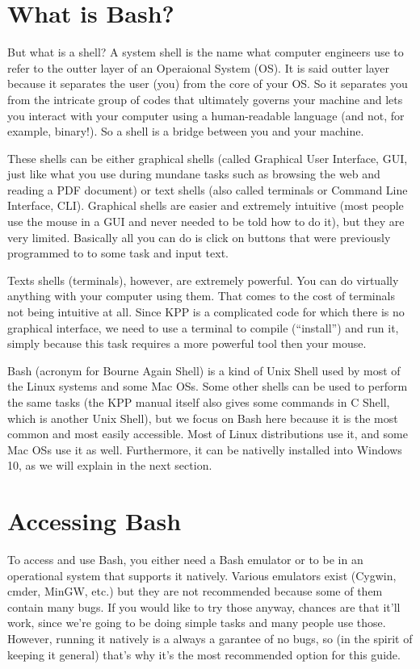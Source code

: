\documentclass[letterpaper,10pt,openany,oneside]{sphinxmanual}
\begin{document}
\section{What is Bash?}
\label{bash:what-is-bash}
But what is a shell? A system shell is the name what computer engineers use to
refer to the outter layer of an Operaional System (OS). It is said outter layer
because it separates the user (you) from the core of your OS. So it separates
you from the intricate group of codes that ultimately governs your machine and
lets you interact with your computer using a human-readable language (and not,
for example, binary!). So a shell is a bridge between you and your machine.

These shells can be either graphical shells (called Graphical User Interface,
GUI, just like what you use during mundane tasks such as browsing the web and
reading a PDF document) or text shells (also called terminals or Command Line
Interface, CLI). Graphical shells are easier and extremely intuitive (most
people use the mouse in a GUI and never needed to be told how to do it), but
they are very limited. Basically all you can do is click on buttons that were
previously programmed to to some task and input text.

Texts shells (terminals), however, are extremely powerful. You can do virtually
anything with your computer using them. That comes to the cost of terminals not
being intuitive at all. Since KPP is a complicated code for which there is no
graphical interface, we need to use a terminal to compile (``install'') and run
it, simply because this task requires a more powerful tool then your mouse.

Bash (acronym for Bourne Again Shell) is a kind of Unix Shell used by most of
the Linux systems and some Mac OSs. Some other shells can be used to perform
the same tasks (the KPP manual itself also gives some commands in C Shell,
which is another Unix Shell), but we focus on Bash here because it is the most
common and most easily accessible.  Most of Linux distributions use it, and
some Mac OSs use it as well. Furthermore, it can be nativelly installed into
Windows 10, as we will explain in the next section.


\section{Accessing Bash}
\label{bash:accessing-bash}
To access and use Bash, you either need a Bash emulator or to be in an
operational system that supports it natively. Various emulators exist (Cygwin,
cmder, MinGW, etc.) but they are not recommended because some of them contain
many bugs. If you would like to try those anyway, chances are that it'll work,
since we're going to be doing simple tasks and many people use those. However,
running it natively is a always a garantee of no bugs, so (in the spirit of
keeping it general) that's why it's the most recommended option for this guide.
\end{document}

